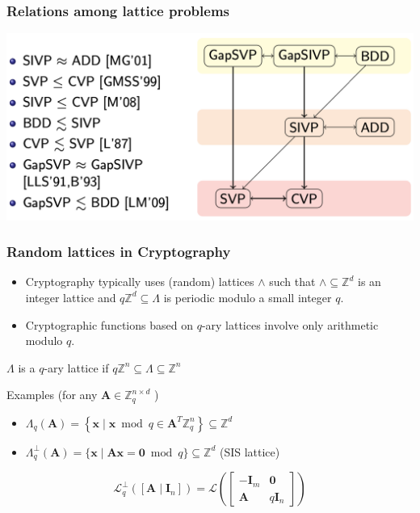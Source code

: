 \documentclass{beamer}
\begin{document}
\begin{frame}
	\frametitle{Relations among lattice problems}
	\includegraphics[scale=0.6]{latticeproblem.png}

\end{frame}


\begin{frame}
	\frametitle{Random lattices in Cryptography}
	\begin{itemize}
		\item Cryptography typically uses (random) lattices $\wedge$ such that
 $\wedge \subseteq \mathbb{Z}^d$ is an integer lattice
and $q \mathbb{Z}^d \subseteq \Lambda$ is periodic modulo a small integer $q$.
\item Cryptographic functions based on $q$-ary lattices involve only arithmetic modulo $q$.
	\end{itemize}
	
	\begin{definition}
$\Lambda$ is a $q$-ary lattice if $q \mathbb{Z}^n \subseteq \Lambda \subseteq \mathbb{Z}^n$
	\end{definition}
	Examples (for any $\mathbf{A} \in \mathbb{Z}_q^{n \times d}$ )
	\begin{itemize}
		\item $\Lambda_q(\mathbf{A})=\left\{\mathbf{x} \mid \mathbf{x} \bmod q \in \mathbf{A}^T \mathbb{Z}_q^n\right\} \subseteq \mathbb{Z}^d$
		\item $\Lambda_q^{\perp}(\mathbf{A})=\{\mathbf{x} \mid \mathbf{A x}=\mathbf{0} \bmod q\} \subseteq \mathbb{Z}^d$ (SIS lattice)
	\end{itemize}
	
	$$
\mathcal{L}_q^{\perp}\left(\left[\mathbf{A} \mid \mathbf{I}_n\right]\right)=\mathcal{L}\left(\left[\begin{array}{cc}
-\mathbf{I}_m & \mathbf{0} \\
\mathbf{A} & q \mathbf{I}_n
\end{array}\right]\right)
$$
\end{frame}
\end{document}
